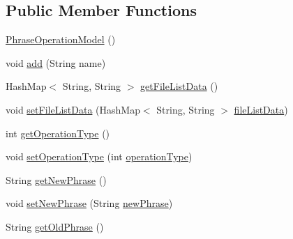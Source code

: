 \subsection*{Public Member Functions}
\begin{DoxyCompactItemize}
\item 
\hyperlink{classcom_1_1poly_1_1nlp_1_1filekommander_1_1views_1_1models_1_1_phrase_operation_model_a0a3dec91dda5527a9e6b91d8fa0eba83}{Phrase\-Operation\-Model} ()
\item 
void \hyperlink{classcom_1_1poly_1_1nlp_1_1filekommander_1_1views_1_1models_1_1_phrase_operation_model_ab5595eb942a1c0567dbc412af601ef7c}{add} (String name)
\item 
Hash\-Map$<$ String, String $>$ \hyperlink{classcom_1_1poly_1_1nlp_1_1filekommander_1_1views_1_1models_1_1_phrase_operation_model_a80fd6066949ef4eabf1a4c0749afc364}{get\-File\-List\-Data} ()
\item 
void \hyperlink{classcom_1_1poly_1_1nlp_1_1filekommander_1_1views_1_1models_1_1_phrase_operation_model_ace58d8b740d482171bccd637875661f7}{set\-File\-List\-Data} (Hash\-Map$<$ String, String $>$ \hyperlink{classcom_1_1poly_1_1nlp_1_1filekommander_1_1views_1_1models_1_1_phrase_operation_model_afdc0b835818c55deb8ff7f22ec6b3d62}{file\-List\-Data})
\item 
int \hyperlink{classcom_1_1poly_1_1nlp_1_1filekommander_1_1views_1_1models_1_1_phrase_operation_model_ad8d071e0e95d8a5f8afe757e457ced11}{get\-Operation\-Type} ()
\item 
void \hyperlink{classcom_1_1poly_1_1nlp_1_1filekommander_1_1views_1_1models_1_1_phrase_operation_model_aeda52758118855e19786c7bb399fd097}{set\-Operation\-Type} (int \hyperlink{classcom_1_1poly_1_1nlp_1_1filekommander_1_1views_1_1models_1_1_phrase_operation_model_a3cc9f099059b9e5e2f53e450e78650f1}{operation\-Type})
\item 
String \hyperlink{classcom_1_1poly_1_1nlp_1_1filekommander_1_1views_1_1models_1_1_phrase_operation_model_a03b0bfac9755a1219712dd15a89ae5d8}{get\-New\-Phrase} ()
\item 
void \hyperlink{classcom_1_1poly_1_1nlp_1_1filekommander_1_1views_1_1models_1_1_phrase_operation_model_ac8da1de30c282f969ffd74a0529d6bb1}{set\-New\-Phrase} (String \hyperlink{classcom_1_1poly_1_1nlp_1_1filekommander_1_1views_1_1models_1_1_phrase_operation_model_a5f8b38d37f7d3ee52d15ef572263168c}{new\-Phrase})
\item 
String \hyperlink{classcom_1_1poly_1_1nlp_1_1filekommander_1_1views_1_1models_1_1_phrase_operation_model_a0a0c1b07cdb6e282e5312957a240d319}{get\-Old\-Phrase} ()

\end{DoxyCompactItemize}
